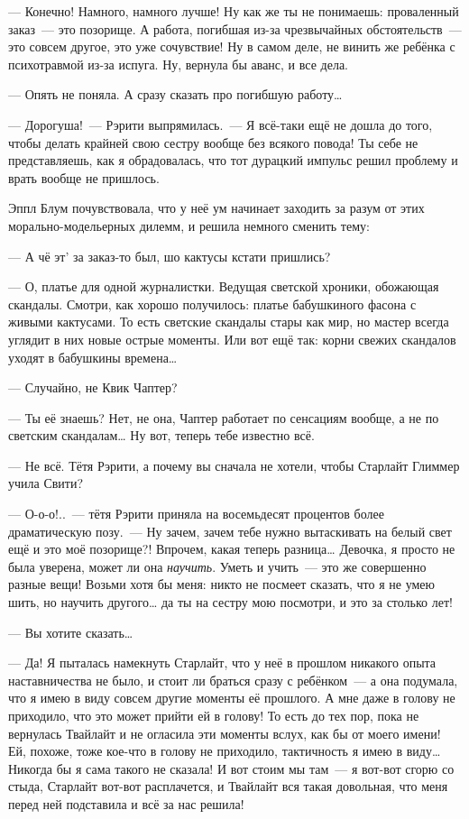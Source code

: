 \documentclass[fontsize=11pt,a5paper,titlepage=firstcover]{scrbook}
\begin{document}
--- Конечно! Намного, намного лучше! Ну как же ты не понимаешь: проваленный заказ~--- это позорище. А работа, погибшая из-за чрезвычайных обстоятельств~--- это совсем другое, это уже сочувствие! Ну в самом деле, не винить же ребёнка с психотравмой из-за испуга. Ну, вернула бы аванс, и все дела.

--- Опять не поняла. А сразу сказать про погибшую работу{\ldots}

--- Дорогуша!~--- Рэрити выпрямилась.~--- Я всё-таки ещё не дошла до того, чтобы делать крайней свою сестру вообще без всякого повода! Ты себе не представляешь, как я обрадовалась, что тот дурацкий импульс решил проблему и врать вообще не пришлось.

Эппл Блум почувствовала, что у неё ум начинает заходить за разум от этих морально-модельерных дилемм, и решила немного сменить тему:

--- А чё эт’ за заказ-то был, шо кактусы кстати пришлись?

--- О, платье для одной журналистки. Ведущая светской хроники, обожающая скандалы. Смотри, как хорошо получилось: платье бабушкиного фасона с живыми кактусами. То есть светские скандалы стары как мир, но мастер всегда углядит в них новые острые моменты. Или вот ещё так: корни свежих скандалов уходят в бабушкины времена{\ldots}

--- Случайно, не Квик Чаптер?

--- Ты её знаешь? Нет, не она, Чаптер работает по сенсациям вообще, а не по светским скандалам{\ldots} Ну вот, теперь тебе известно всё.

--- Не всё. Тётя Рэрити, а почему вы сначала не хотели, чтобы Старлайт Глиммер учила Свити?

--- О-о-о!..~--- тётя Рэрити приняла на восемьдесят процентов более драматическую позу.~--- Ну зачем, зачем тебе нужно вытаскивать на белый свет ещё и это моё позорище?! Впрочем, какая теперь разница{\ldots} Девочка, я просто не была уверена, может ли она \emph{научить}. Уметь и учить~--- это же совершенно разные вещи! Возьми хотя бы меня: никто не посмеет сказать, что я не умею шить, но научить другого{\ldots} да ты на сестру мою посмотри, и это за столько лет!

--- Вы хотите сказать{\ldots}

--- Да! Я пыталась намекнуть Старлайт, что у неё в прошлом никакого опыта наставничества не было, и стоит ли браться сразу с ребёнком~--- а она подумала, что я имею в виду совсем другие моменты её прошлого. А мне даже в голову не приходило, что это может прийти ей в голову! То есть до тех пор, пока не вернулась Твайлайт и не огласила эти моменты вслух, как бы от моего имени! Ей, похоже, тоже кое-что в голову не приходило, тактичность я имею в виду{\ldots} Никогда бы я сама такого не сказала! И вот стоим мы там~--- я вот-вот сгорю со стыда, Старлайт вот-вот расплачется, и Твайлайт вся такая довольная, что меня перед ней подставила и всё за нас решила!
\end{document}

